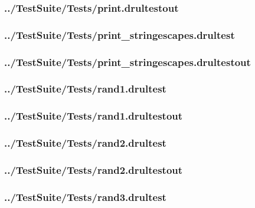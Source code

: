 \begin{changemargin}{-1in}{-1in}
\subsubsection{../TestSuite/Tests/print.drultestout}


\subsubsection{../TestSuite/Tests/print\_stringescapes.drultest}


\subsubsection{../TestSuite/Tests/print\_stringescapes.drultestout}


\subsubsection{../TestSuite/Tests/rand1.drultest}


\subsubsection{../TestSuite/Tests/rand1.drultestout}


\subsubsection{../TestSuite/Tests/rand2.drultest}


\subsubsection{../TestSuite/Tests/rand2.drultestout}


\subsubsection{../TestSuite/Tests/rand3.drultest}



\end{changemargin}
